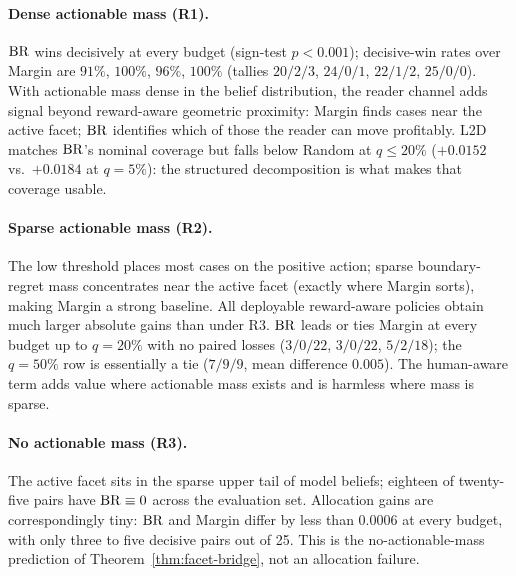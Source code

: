 \paragraph{Dense actionable mass (R1).}
$\operatorname{BR}$ wins decisively at every budget (sign-test $p<0.001$); decisive-win rates over Margin are $91\%$, $100\%$, $96\%$, $100\%$ (tallies $20/2/3$, $24/0/1$, $22/1/2$, $25/0/0$).
With actionable mass dense in the belief distribution, the reader channel adds signal beyond reward-aware geometric proximity: Margin finds cases near the active facet; $\operatorname{BR}$ identifies which of those the reader can move profitably.
L2D matches $\operatorname{BR}$'s nominal coverage but falls below Random at $q\!\le\!20\%$ ($+0.0152$ vs.\ $+0.0184$ at $q\!=\!5\%$): the structured decomposition is what makes that coverage usable.

\paragraph{Sparse actionable mass (R2).}
The low threshold places most cases on the positive action; sparse boundary-regret mass concentrates near the active facet (exactly where Margin sorts), making Margin a strong baseline. All deployable reward-aware policies obtain much larger absolute gains than under R3.
$\operatorname{BR}$ leads or ties Margin at every budget up to $q=20\%$ with no paired losses ($3/0/22$, $3/0/22$, $5/2/18$); the $q=50\%$ row is essentially a tie ($7/9/9$, mean difference $0.005$).
The human-aware term adds value where actionable mass exists and is harmless where mass is sparse.

\paragraph{No actionable mass (R3).}
The active facet sits in the sparse upper tail of model beliefs; eighteen of twenty-five pairs have $\operatorname{BR}\equiv 0$ across the evaluation set.
Allocation gains are correspondingly tiny: $\operatorname{BR}$ and Margin differ by less than $0.0006$ at every budget, with only three to five decisive pairs out of 25.
This is the no-actionable-mass prediction of Theorem~\ref{thm:facet-bridge}, not an allocation failure.

